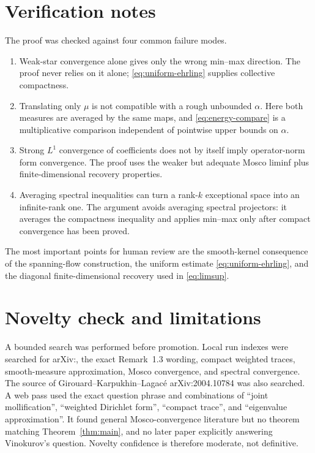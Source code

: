 \documentclass[11pt]{article}
\begin{document}
\section*{Verification notes}

The proof was checked against four common failure modes.
\begin{enumerate}[leftmargin=*]
\item Weak-star convergence alone gives only the wrong min--max direction.
      The proof never relies on it alone; \eqref{eq:uniform-ehrling} supplies
      collective compactness.
\item Translating only \(\mu\) is not compatible with a rough unbounded
      \(\alpha\).  Here both measures are averaged by the same maps, and
      \eqref{eq:energy-compare} is a multiplicative comparison independent of
      pointwise upper bounds on \(\alpha\).
\item Strong \(L^1\) convergence of coefficients does not by itself imply
      operator-norm form convergence.  The proof uses the weaker but adequate
      Mosco liminf plus finite-dimensional recovery properties.
\item Averaging spectral inequalities can turn a rank-\(k\) exceptional space
      into an infinite-rank one.  The argument avoids averaging spectral
      projectors: it averages the compactness inequality and applies min--max
      only after compact convergence has been proved.
\end{enumerate}

The most important points for human review are the smooth-kernel consequence
of the spanning-flow construction, the uniform estimate
\eqref{eq:uniform-ehrling}, and the diagonal finite-dimensional recovery used
in \eqref{eq:limsup}.

\section*{Novelty check and limitations}

A bounded search was performed before promotion.  Local run indexes were
searched for arXiv:, the exact Remark~1.3 wording,
compact weighted
traces, smooth-measure approximation, Mosco convergence, and spectral
convergence.  The source of Girouard--Karpukhin--Lagac\'e arXiv:2004.10784 was
also searched.  A web pass used the exact question phrase and combinations of
``joint mollification'', ``weighted Dirichlet form'', ``compact trace'', and
``eigenvalue approximation''.  It found general Mosco-convergence literature
but no theorem matching Theorem~\ref{thm:main}, and no later paper explicitly
answering Vinokurov's question.  Novelty confidence is therefore moderate,
not definitive.
\end{document}
